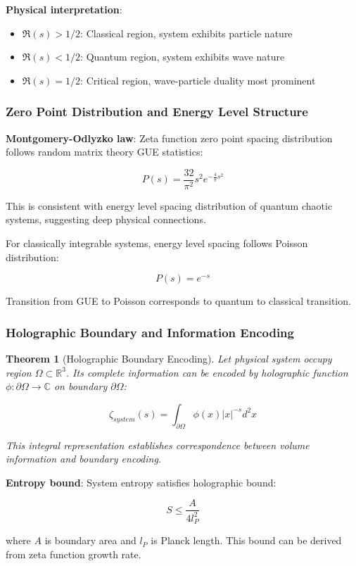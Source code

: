 \documentclass[12pt,a4paper]{article}
\newtheorem{theorem}{Theorem}[section]
\begin{document}
\textbf{Physical interpretation}:
\begin{itemize}
\item $\Re(s) > 1/2$: Classical region, system exhibits particle nature
\item $\Re(s) < 1/2$: Quantum region, system exhibits wave nature
\item $\Re(s) = 1/2$: Critical region, wave-particle duality most prominent
\end{itemize}

\subsubsection{Zero Point Distribution and Energy Level Structure}

\textbf{Montgomery-Odlyzko law}: Zeta function zero point spacing distribution follows random matrix theory GUE statistics:

$$P(s) = \frac{32}{\pi^2} s^2 e^{-\frac{4}{\pi}s^2}$$

This is consistent with energy level spacing distribution of quantum chaotic systems, suggesting deep physical connections.

For classically integrable systems, energy level spacing follows Poisson distribution:

$$P(s) = e^{-s}$$

Transition from GUE to Poisson corresponds to quantum to classical transition.

\subsubsection{Holographic Boundary and Information Encoding}

\begin{theorem}[Holographic Boundary Encoding]
Let physical system occupy region $\Omega \subset \mathbb{R}^3$. Its complete information can be encoded by holographic function $\phi: \partial\Omega \to \mathbb{C}$ on boundary $\partial\Omega$:

$$\zeta_{system}(s) = \int_{\partial\Omega} \phi(x) |x|^{-s} d^2x$$

This integral representation establishes correspondence between volume information and boundary encoding.
\end{theorem}

\textbf{Entropy bound}: System entropy satisfies holographic bound:

$$S \leq \frac{A}{4l_P^2}$$

where $A$ is boundary area and $l_P$ is Planck length. This bound can be derived from zeta function growth rate.
\end{document}
